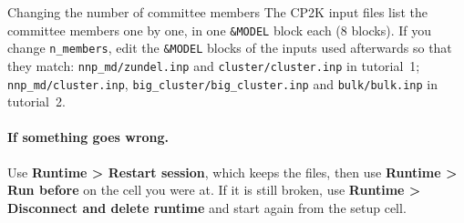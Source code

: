\documentclass[11pt,a4paper]{article}
\newcommand{\menu}[1]{\textsf{\textbf{#1}}}
\begin{document}
\begin{keybox}{Changing the number of committee members}
The CP2K input files list the committee members one by one, in one
\texttt{\&MODEL} block each (8 blocks). If you change \texttt{n\_members}, edit
the \texttt{\&MODEL} blocks of the inputs used afterwards so that they match:
\texttt{nnp\_md/zundel.inp} and \texttt{cluster/cluster.inp} in tutorial~1;
\texttt{nnp\_md/cluster.inp}, \texttt{big\_cluster/big\_cluster.inp} and
\texttt{bulk/bulk.inp} in tutorial~2.
\end{keybox}

\paragraph{If something goes wrong.} Use \menu{Runtime > Restart session},
which keeps the files, then use \menu{Runtime > Run before} on the cell you
were at. If it is still broken, use \menu{Runtime > Disconnect
and delete runtime} and start again from the setup cell.
\end{document}
